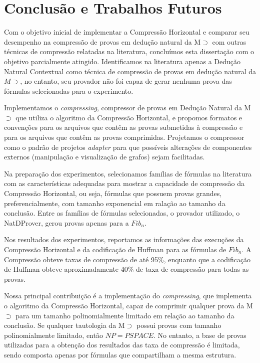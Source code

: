 
\chapter{Conclusão e Trabalhos Futuros}
\label{cap:conc_trab}

Com o objetivo inicial de implementar a Compressão Horizontal e comparar seu desempenho na compressão de provas em dedução natural da M$\supset$ com outras técnicas de compressão relatadas na literatura, concluímos esta dissertação com o objetivo parcialmente atingido. Identificamos na literatura apenas a Dedução Natural Contextual \cite{NDcPaleo} como técnica de compressão de provas em dedução natural da $M\supset$, no entanto, seu provador \cite{paleo2015implementation} não foi capaz de gerar nenhuma prova das fórmulas selecionadas para o experimento.

Implementamos o \textit{compressing}, compressor de provas em Dedução Natural da M$\supset$ que utiliza o algoritmo da Compressão Horizontal, e propomos formatos e convenções para os arquivos que contêm as provas submetidas à compressão e para os arquivos que contêm as provas comprimidas. Projetamos o compressor como o padrão de projetos \textit{adapter} para que possíveis alterações de componentes externos (manipulação e visualização de grafos) sejam facilitadas.

Na preparação dos experimentos, selecionamos famílias de fórmulas na literatura com as características adequadas para mostrar a capacidade de compressão da Compressão Horizontal, ou seja, fórmulas que possuem provas grandes, preferencialmente, com tamanho exponencial em ralação ao tamanho da conclusão. Entre as famílias de fórmulas selecionadas, o provador utilizado, o NatDProver, gerou provas apenas para a $Fib_n$.

Nos resultados dos experimentos, reportamos as informações das execuções da Compressão Horizontal e da codificação de Huffman para as fórmulas de $Fib_n$. A Compressão obteve taxas de compressão de até 95\%, enquanto que a codificação de Huffman obteve aproximadamente 40\% de taxa de compressão para todas as provas.

Nossa principal contribuição é a implementação do \textit{compressing}, que implementa o algoritmo da Compressão Horizontal, capaz de comprimir qualquer prova da M$\supset$ para um tamanho polinomialmente limitado em relação ao tamanho da conclusão. Se qualquer tautologia da M$\supset$ possui provas com tamanho polinomialmente limitado, então $NP = PSPACE$. No entanto, a base de provas utilizadas para a obtenção dos resultados das taxa  de compressão é limitada, sendo composta apenas por fórmulas que compartilham a mesma estrutura. 

